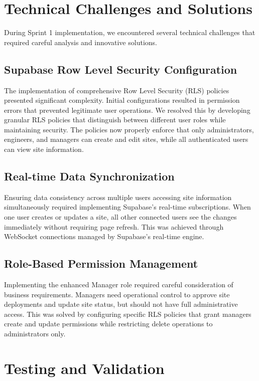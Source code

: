 \section{Technical Challenges and Solutions}

During Sprint 1 implementation, we encountered several technical challenges that required careful analysis and innovative solutions.

\subsection{Supabase Row Level Security Configuration}

The implementation of comprehensive Row Level Security (RLS) policies presented significant complexity. Initial configurations resulted in permission errors that prevented legitimate user operations. We resolved this by developing granular RLS policies that distinguish between different user roles while maintaining security. The policies now properly enforce that only administrators, engineers, and managers can create and edit sites, while all authenticated users can view site information.

\subsection{Real-time Data Synchronization}

Ensuring data consistency across multiple users accessing site information simultaneously required implementing Supabase's real-time subscriptions. When one user creates or updates a site, all other connected users see the changes immediately without requiring page refresh. This was achieved through WebSocket connections managed by Supabase's real-time engine.

\subsection{Role-Based Permission Management}

Implementing the enhanced Manager role required careful consideration of business requirements. Managers need operational control to approve site deployments and update site status, but should not have full administrative access. This was solved by configuring specific RLS policies that grant managers create and update permissions while restricting delete operations to administrators only.

\section{Testing and Validation}

